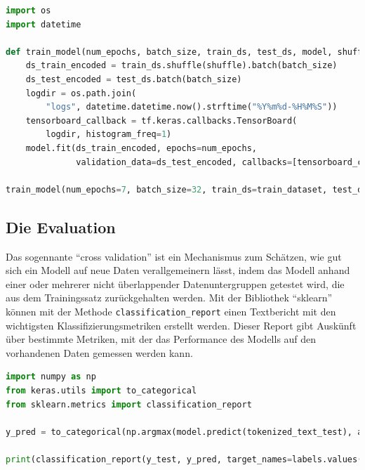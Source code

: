 \begin{lstlisting}[language=Python,caption=Das Training des Models]
import os
import datetime

def train_model(num_epochs, batch_size, train_ds, test_ds, model, shuffle):
    ds_train_encoded = train_ds.shuffle(shuffle).batch(batch_size)
    ds_test_encoded = test_ds.batch(batch_size)
    logdir = os.path.join(
        "logs", datetime.datetime.now().strftime("%Y%m%d-%H%M%S"))
    tensorboard_callback = tf.keras.callbacks.TensorBoard(
        logdir, histogram_freq=1)
    model.fit(ds_train_encoded, epochs=num_epochs,
              validation_data=ds_test_encoded, callbacks=[tensorboard_callback])
    
train_model(num_epochs=7, batch_size=32, train_ds=train_dataset, test_ds=test_dataset, model=model, shuffle=1000)
\end{lstlisting}\label{TrainModel}

\subsection{Die Evaluation}

Das sogennante \enquote{cross validation} ist ein Mechanismus zum Schätzen, wie gut sich ein Modell auf neue Daten verallgemeinern lässt, indem das Modell anhand einer oder mehrerer nicht überlappender Datenuntergruppen getestet wird, die aus dem Trainingssatz zurückgehalten werden. Mit der Bibliothek \enquote{sklearn} können mit der Methode \texttt{classification\_report} einen Textbericht mit den wichtigsten Klassifizierungsmetriken erstellt werden. Dieser Report gibt Auskünft über bestimmte Metriken, mit der das Performance des Modells auf den vorhandenen Daten gemessen werden kann.

\begin{lstlisting}[language=Python,caption=Das Evaluieren des Models]
import numpy as np
from keras.utils import to_categorical
from sklearn.metrics import classification_report

y_pred = to_categorical(np.argmax(model.predict(tokenized_text_test), axis=1))

print(classification_report(y_test, y_pred, target_names=labels.values(), digits=4))
\end{lstlisting}\label{TrainModel}



